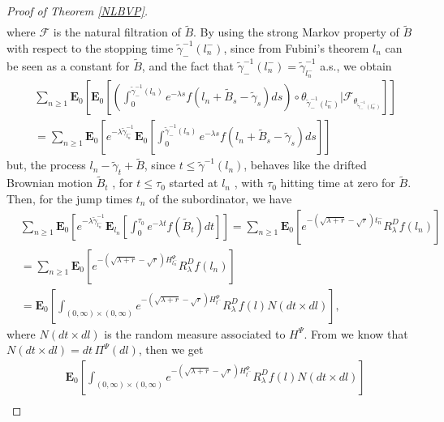 \documentclass[11pt,a4paper]{article}
\theoremstyle{definition}
\theoremstyle{remark}
\begin{document}
\begin{proof}[Proof of Theorem \ref{NLBVP}]
\begin{align*}
	\end{align*}
	where $\mathcal{F}$ is the natural filtration of $\widetilde{B}$. By using the strong Markov property of $\widetilde{B}$ with respect to the stopping time $\widetilde{\gamma}_{-}^{-1}(l_n^-)$, since from Fubini's theorem $l_n$ can be seen as a constant for \(\widetilde{B}\), and the fact that $\widetilde{\gamma}_{-}^{-1}(l_n^-)= \widetilde{\gamma}^{-1}_{l_n^-}$ a.s., we obtain
	\begin{align*}
		&\sum_{n \geq 1} \mathbf{E}_{0}\left[ \mathbf{E}_{0} \left[ \left(\int_0^{\widetilde{\gamma}_{-}^{-1}(l_n)} e^{-\lambda s } f(l_n + \widetilde{B}_s - \widetilde{\gamma}_s) ds\right) \circ \theta_{\widetilde{\gamma}^{-1}_{-}(l_n^-) }\Big\vert \mathcal{F}_{\theta_{\widetilde{\gamma}_{-}^{-1}(l_n^-)}}\right]\right]\\
		&=\sum_{n \geq 1} \mathbf{E}_{0}\left[e^{-\lambda \widetilde{\gamma}^{-1}_{l_n^-}} \mathbf{E}_{0} \left[\int_0^{\widetilde{\gamma}_{-}^{-1}(l_n)} e^{-\lambda s } f(l_n +\widetilde{B}_s - \widetilde{\gamma}_s) ds \right] \right]
	\end{align*}
	but, the process  $l_n-\widetilde{\gamma}_t + \widetilde{B}$,  since $t \leq \widetilde{\gamma}^{-1}(l_n) $,  behaves like the drifted Brownian motion \(\widetilde{B}_t\) , for \(t \leq \tau_0\) started at $l_n$ , with $\tau_0$ hitting time at zero for $\widetilde{B}$. Then, for the jump times \(t_n\) of the subordinator, we have
	\begin{align*}
		&\sum_{n \geq 1}  \mathbf{E}_{0} \left[e^{-\lambda \widetilde{\gamma}^{-1}_{l_n^-}} \mathbf{E}_{l_n}\left[ \int_{0}^{\tau_0} e^{-\lambda t} f(\widetilde{B}_t) dt \right]\right]
		=\sum_{n \geq 1} \mathbf{E}_{0} \left[e^{-(\sqrt{\lambda+r}-\sqrt{r}) t_n^-} {R}_\lambda^D f(l_n)\right]\\
		&=\sum_{n \geq 1} \mathbf{E}_{0} \left[e^{-(\sqrt{\lambda+r}-\sqrt{r}) H^\Psi_{l_n^-}} {R}_\lambda^D f(l_n)\right]\\
		&=\mathbf{E}_{0} \left[\int_{(0,\infty) \times (0,\infty)} e^{-(\sqrt{\lambda+r}-\sqrt{r}) H^\Psi_{t^-}} {R}_\lambda^D f(l) N(dt \times dl)\right],
	\end{align*}
	where $N(dt \times dl)$ is the random measure associated to $H^\Psi$. From \cite[Example II.4.1]{ikeda2014stochastic} we know that $N(dt \times dl)= dt \, \Pi^\Psi(dl)$, then we get
	\begin{align*}
		&\mathbf{E}_{0} \left[\int_{(0,\infty) \times (0,\infty)} e^{-(\sqrt{\lambda+r}-\sqrt{r}) H^\Psi_{t^-}} {R}_\lambda^D f( l) N(dt \times dl)\right]\\

\end{align*}
\end{proof}
\end{document}
